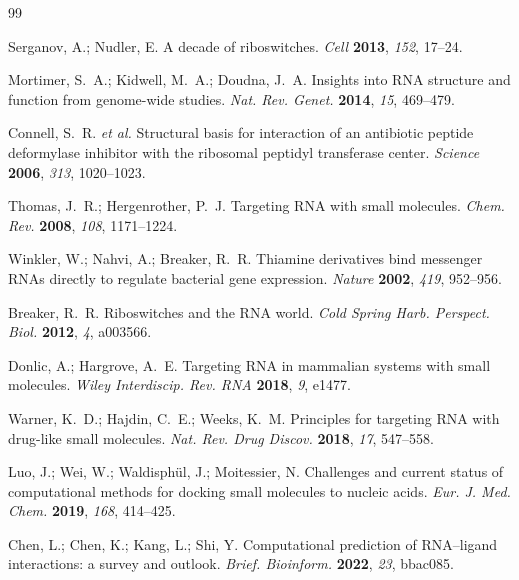 \documentclass[10pt,twocolumn]{article}
\begin{document}
\begingroup
\small
\begin{thebibliography}{99}

Serganov, A.; Nudler, E.
A decade of riboswitches.
\textit{Cell} \textbf{2013}, \textit{152}, 17--24.

Mortimer, S.~A.; Kidwell, M.~A.; Doudna, J.~A.
Insights into RNA structure and function from genome-wide studies.
\textit{Nat. Rev. Genet.} \textbf{2014}, \textit{15}, 469--479.

Connell, S.~R. \textit{et al.}
Structural basis for interaction of an antibiotic peptide deformylase
inhibitor with the ribosomal peptidyl transferase center.
\textit{Science} \textbf{2006}, \textit{313}, 1020--1023.

Thomas, J.~R.; Hergenrother, P.~J.
Targeting RNA with small molecules.
\textit{Chem. Rev.} \textbf{2008}, \textit{108}, 1171--1224.

Winkler, W.; Nahvi, A.; Breaker, R.~R.
Thiamine derivatives bind messenger RNAs directly to regulate bacterial
gene expression.
\textit{Nature} \textbf{2002}, \textit{419}, 952--956.

Breaker, R.~R.
Riboswitches and the RNA world.
\textit{Cold Spring Harb. Perspect. Biol.} \textbf{2012}, \textit{4}, a003566.

Donlic, A.; Hargrove, A.~E.
Targeting RNA in mammalian systems with small molecules.
\textit{Wiley Interdiscip. Rev. RNA} \textbf{2018}, \textit{9}, e1477.

Warner, K.~D.; Hajdin, C.~E.; Weeks, K.~M.
Principles for targeting RNA with drug-like small molecules.
\textit{Nat. Rev. Drug Discov.} \textbf{2018}, \textit{17}, 547--558.

Luo, J.; Wei, W.; Waldisph\"ul, J.; Moitessier, N.
Challenges and current status of computational methods for docking small
molecules to nucleic acids.
\textit{Eur. J. Med. Chem.} \textbf{2019}, \textit{168}, 414--425.

Chen, L.; Chen, K.; Kang, L.; Shi, Y.
Computational prediction of RNA--ligand interactions: a survey and outlook.
\textit{Brief. Bioinform.} \textbf{2022}, \textit{23}, bbac085.


\end{thebibliography}
\end{document}
